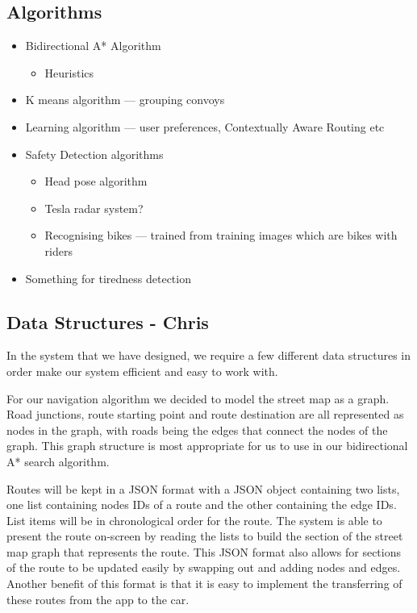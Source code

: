 \documentclass{article}
\begin{document}
\subsection{Algorithms}\label{ssec:algorithms}
\begin{itemize}
  \item Bidirectional A* Algorithm
    \begin{itemize}
      \item Heuristics
    \end{itemize}
  \item K means algorithm --- grouping convoys
  \item Learning algorithm --- user preferences, Contextually Aware Routing etc
  \item Safety Detection algorithms
    \begin{itemize}
      \item Head pose algorithm
      \item Tesla radar system?
      \item Recognising bikes --- trained from training images which are bikes with riders
    \end{itemize}
  \item Something for tiredness detection
\end{itemize}

\subsection{Data Structures - Chris}\label{ssec:data-structures}
In the system that we have designed, we require a few different data structures in order make our system efficient and easy to work with.

For our navigation algorithm we decided to model the street map as a graph. Road junctions, route starting point and route destination are all represented as nodes in the graph, with roads being the edges that connect the nodes of the graph. This graph structure is most appropriate for us to use in our bidirectional A* search algorithm.

Routes will be kept in a JSON format with a JSON object containing two lists, one list containing nodes IDs of a route and the other containing the edge IDs. List items will be in chronological order for the route. The system is able to present the route on-screen by reading the lists to build the section of the street map graph that represents the route. This JSON format also allows for sections of the route to be updated easily by swapping out and adding nodes and edges. Another benefit of this format is that it is easy to implement the transferring of these routes from the app to the car.
\end{document}
